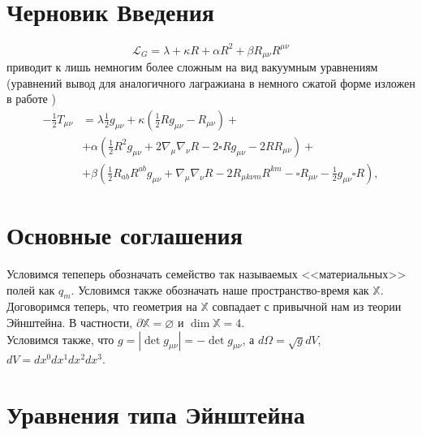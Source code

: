 \documentclass[a4paper, 14pt]{scrarticle}
\theoremstyle{Imperial}
\begin{document}
	\section{Черновик Введения}
	$$\mathcal{L}_G = \lambda + \kappa R + \alpha R^2 + \beta R_{\mu\nu}R^{\mu\nu}$$
	приводит к лишь немногим более сложным на вид вакуумным уравнениям (уравнений вывод для аналогичного лагражиана в немного сжатой форме изложен в работе \cite{PhRew})
	$$\begin{aligned}
		-\frac{1}{2}T_{\mu\nu} &=\lambda\frac{1}{2}g_{\mu\nu}+\kappa\left(\frac{1}{2}Rg_{\mu\nu}-R_{\mu\nu}\right)+\\
		&+\alpha\left(\frac{1}{2}R^{2}g_{\mu\nu}+2\nabla_{\mu}\nabla_{\nu}R-2\square Rg_{\mu\nu}-2RR_{\mu\nu}\right)+\\	
		&+\beta\left(\frac{1}{2}R_{ab}R^{ab}g_{\mu\nu}+\nabla_{\mu}\nabla_{\nu}R-2R_{\mu k\nu m}R^{km}-\square R_{\mu\nu}-\frac{1}{2}g_{\mu\nu}\square R\right),
	\end{aligned}$$
	
	\section{Основные соглашения}
	
	Условимся тепеперь обозначать семейство так называемых <<материальных>> полей как $q_m$. Условимся также обозначать наше пространство-время как $\mathbb{X}$.\\
	Договоримся теперь, что геометрия на $\mathbb{X}$ совпадает с привычной нам из теории Эйнштейна. В частности, $\partial \mathbb{X} = \varnothing$ и $\dim \mathbb{X} = 4$. \\ 
	Условимся также, что $g = \left| \det g_{\mu\nu} \right| = - \det g_{\mu\nu}$, а $d\Omega = \sqrt{g} dV$, $dV = dx^0dx^1dx^2dx^3$.\\
	
	\section{Уравнения типа Эйнштейна}
	
\end{document}
